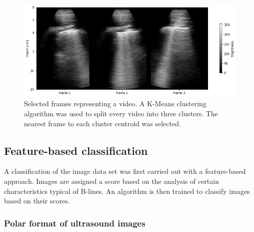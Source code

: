 \documentclass[12pt]{article} %
\begin{document}
		
	\begin{figure}
	\centering
		\includegraphics[width=\textwidth]{figuras/key_frames.png}
	\caption{\small Selected frames representing a video. A K-Means clustering algorithm was used to split every video into three clusters. The nearest frame to each cluster centroid was selected.}
	\label{key_frames}
	\end{figure}		
	
	


\subsection{Feature-based classification}
A classification of the image data set was first carried out with a feature-based approach. Images are assigned a score based on the analysis of certain characteristics typical of B-lines. An algorithm is then trained to classify images based on their scores.

\subsubsection{Polar format of ultrasound images}
\end{document}
